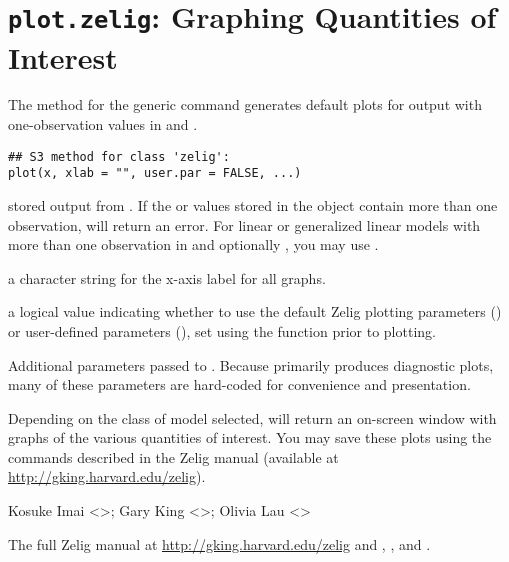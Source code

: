  \section{{\tt plot.zelig}: Graphing Quantities of Interest}\label{ss:plot.zelig}
\begin{Description}\relax
The  method for the generic 
command generates default plots for  output with
one-observation values in  and .
\end{Description}
\begin{Usage}
\begin{verbatim}
## S3 method for class 'zelig':
plot(x, xlab = "", user.par = FALSE, ...)
\end{verbatim}
\end{Usage}
\begin{Arguments}
\begin{ldescription}
\item[\code{x}] stored output from .  If the  or
 values stored in the object contain more than one
observation,  will return an error.  For linear or
generalized linear models with more than one observation in 
and optionally , you may use .  
\item[\code{xlab}] a character string for the x-axis label for all graphs.
\item[\code{user.par}] a logical value indicating whether to use the default
Zelig plotting parameters () or
user-defined parameters (), set using the
 function prior to plotting. 
\item[\code{...}] Additional parameters passed to .
Because  primarily produces diagnostic plots, many
of these parameters are hard-coded for convenience and
presentation. 
\end{ldescription}
\end{Arguments}
\begin{Value}
Depending on the class of model selected,  will
return an on-screen window with graphs of the various quantities of
interest.  You may save these plots using the commands described in
the Zelig manual (available at \url{http://gking.harvard.edu/zelig}).
\end{Value}
\begin{Author}\relax
Kosuke Imai <>; Gary King
<>; Olivia Lau <>
\end{Author}
\begin{SeeAlso}\relax
The full Zelig manual at
\url{http://gking.harvard.edu/zelig} and , ,
and .
\end{SeeAlso}


